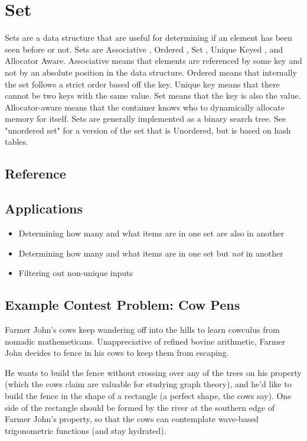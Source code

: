 \section{Set}
Sets are a data structure that are useful for determining if an element has been seen before or not.
Sets are Associative , Ordered , Set , Unique Keyed , and Allocator Aware\cite{cplusplus}.
Associative means that elements are referenced by some key and not by an absolute position in the data structure.
Ordered means that internally the set follows a strict order based off the key.
Unique key means that there cannot be two keys with the same value.
Set means that the key is also the value.
Allocator-aware means that the container knows who to dynamically allocate memory for itself.
Sets are generally implemented as a binary search tree.
See "unordered set" for a version of the set that is Unordered, but is based on hash tables.

\subsection{Reference}


\subsection{Applications}
\begin{itemize}
    \item   Determining how many and what items are in one set are also in another
    \item   Determining how many and what items are in one set but \emph{not} in another
    \item   Filtering out non-unique inputs
\end{itemize}

\subsection{Example Contest Problem: Cow Pens}
Farmer John's cows keep wandering off into the hills to learn cowculus from nomadic mathemeticans.
Unappreciative of refined bovine arithmetic, Farmer John decides to fence in his cows to keep them from escaping.

He wants to build the fence without crossing over any of the trees on his property (which the cows claim are valuable for studying graph theory), and he'd like to build the fence in the shape of a rectangle (a perfect shape, the cows say).
One side of the rectangle should be formed by the river at the southern edge of Farmer John's property, so that the cows can contemplate wave-based trigonometric functions (and stay hydrated).

